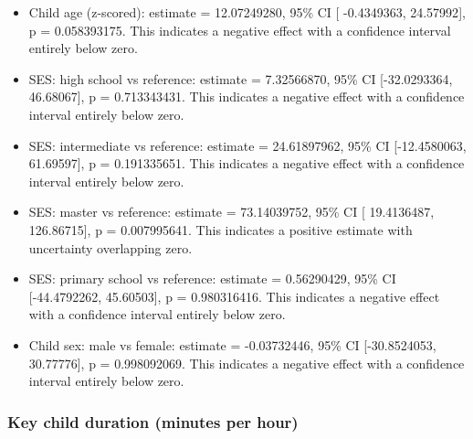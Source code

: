 \documentclass[
  letterpaper,
  DIV=11,
  numbers=noendperiod]{scrartcl}
\providecommand{\tightlist}{%
  \setlength{\itemsep}{0pt}\setlength{\parskip}{0pt}}\usepackage{longtable,booktabs,array}
\begin{document}
\begin{itemize}
\tightlist
\item
  Child age (z-scored): estimate = 12.07249280, 95\% CI {[} -0.4349363,
  24.57992{]}, p = 0.058393175. This indicates a negative effect with a
  confidence interval entirely below zero.
\item
  SES: high school vs reference: estimate = 7.32566870, 95\% CI
  {[}-32.0293364, 46.68067{]}, p = 0.713343431. This indicates a
  negative effect with a confidence interval entirely below zero.
\item
  SES: intermediate vs reference: estimate = 24.61897962, 95\% CI
  {[}-12.4580063, 61.69597{]}, p = 0.191335651. This indicates a
  negative effect with a confidence interval entirely below zero.
\item
  SES: master vs reference: estimate = 73.14039752, 95\% CI {[}
  19.4136487, 126.86715{]}, p = 0.007995641. This indicates a positive
  estimate with uncertainty overlapping zero.
\item
  SES: primary school vs reference: estimate = 0.56290429, 95\% CI
  {[}-44.4792262, 45.60503{]}, p = 0.980316416. This indicates a
  negative effect with a confidence interval entirely below zero.
\item
  Child sex: male vs female: estimate = -0.03732446, 95\% CI
  {[}-30.8524053, 30.77776{]}, p = 0.998092069. This indicates a
  negative effect with a confidence interval entirely below zero.
\end{itemize}

\hypertarget{key-child-duration-minutes-per-hour-1}{%
\subsubsection{Key child duration (minutes per
hour)}\label{key-child-duration-minutes-per-hour-1}}
\end{document}
